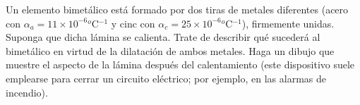 Un elemento bimetálico está formado por dos tiras de metales diferentes (acero con $\alpha_a = 11\times 10^{-6}$$^o$C$^{-1}$  y cinc con $\alpha_c = 25\times 10^{-6}$$^o$C$^{-1}$), firmemente unidas. Suponga que dicha lámina se calienta. Trate de describir qué sucederá al bimetálico en virtud de la dilatación de ambos metales. Haga un dibujo que muestre el aspecto de la lámina después del calentamiento (este dispositivo suele emplearse para cerrar un circuito eléctrico; por ejemplo, en las alarmas de incendio).